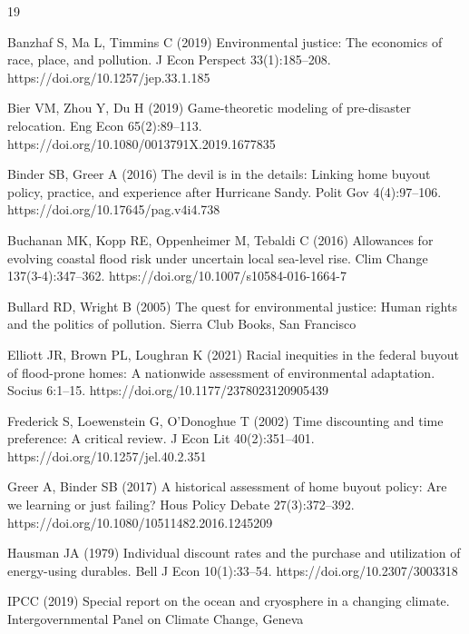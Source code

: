 \documentclass[12pt,a4paper]{article}
\begin{document}

\begin{thebibliography}{19}

Banzhaf S, Ma L, Timmins C (2019) Environmental justice: The economics of race, place, and pollution. J Econ Perspect 33(1):185--208. https://doi.org/10.1257/jep.33.1.185

Bier VM, Zhou Y, Du H (2019) Game-theoretic modeling of pre-disaster relocation. Eng Econ 65(2):89--113. https://doi.org/10.1080/0013791X.2019.1677835

Binder SB, Greer A (2016) The devil is in the details: Linking home buyout policy, practice, and experience after Hurricane Sandy. Polit Gov 4(4):97--106. https://doi.org/10.17645/pag.v4i4.738

Buchanan MK, Kopp RE, Oppenheimer M, Tebaldi C (2016) Allowances for evolving coastal flood risk under uncertain local sea-level rise. Clim Change 137(3-4):347--362. https://doi.org/10.1007/s10584-016-1664-7

Bullard RD, Wright B (2005) The quest for environmental justice: Human rights and the politics of pollution. Sierra Club Books, San Francisco

Elliott JR, Brown PL, Loughran K (2021) Racial inequities in the federal buyout of flood-prone homes: A nationwide assessment of environmental adaptation. Socius 6:1--15. https://doi.org/10.1177/2378023120905439

Frederick S, Loewenstein G, O'Donoghue T (2002) Time discounting and time preference: A critical review. J Econ Lit 40(2):351--401. https://doi.org/10.1257/jel.40.2.351

Greer A, Binder SB (2017) A historical assessment of home buyout policy: Are we learning or just failing? Hous Policy Debate 27(3):372--392. https://doi.org/10.1080/10511482.2016.1245209

Hausman JA (1979) Individual discount rates and the purchase and utilization of energy-using durables. Bell J Econ 10(1):33--54. https://doi.org/10.2307/3003318

IPCC (2019) Special report on the ocean and cryosphere in a changing climate. Intergovernmental Panel on Climate Change, Geneva


\end{thebibliography}
\end{document}
